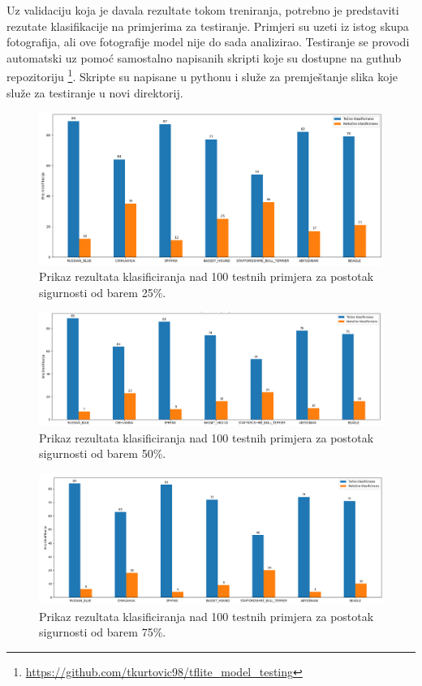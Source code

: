 Uz validaciju koja je davala rezultate tokom treniranja, potrebno je predstaviti rezutate klasifikacije na primjerima za testiranje. Primjeri su uzeti iz istog skupa fotografija, ali ove fotografije
model nije do sada analizirao. Testiranje se provodi automatski uz pomoć samostalno napisanih skripti koje su dostupne na guthub repozitoriju \footnote{\url{https://github.com/tkurtovic98/tflite_model_testing}}.
Skripte su napisane u pythonu i služe za premještanje slika koje služe za testiranje u novi direktorij. 

\begin{figure}[htb]
    \centering
    \includegraphics[width=14cm]{img/Klasifikacija_25.png}
    \caption{Prikaz rezultata klasificiranja nad 100 testnih primjera za postotak sigurnosti od barem 25\%. }
    \label{Klasifikacija25}
\end{figure}

\begin{figure}[htb]
    \centering
    \includegraphics[width=14cm]{img/Klasifikacija_test.png}
    \caption{Prikaz rezultata klasificiranja nad 100 testnih primjera za postotak sigurnosti od barem 50\%.}
    \label{Klasifikacija50}
\end{figure}

\begin{figure}[htb]
    \centering
    \includegraphics[width=14cm]{img/Klas75.png}
    \caption{Prikaz rezultata klasificiranja nad 100 testnih primjera za postotak sigurnosti od barem 75\%.}
    \label{Klasifikacija75}
\end{figure}


